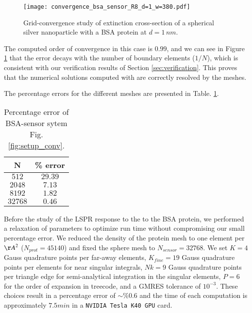 \begin{figure}[h] %
   \centering
   \texttt{[image: convergence\_bsa\_sensor\_R8\_d=1\_w=380.pdf]} 
   \caption{Grid-convergence study of extinction cross-section of a spherical silver
            nanoparticle with a BSA protein at $d=1 \, nm$.}
   \label{fig:error_sphere-bsa}
\end{figure}

The computed order of convergence in this case is $0.99$, and we can see in 
Figure \ref{fig:error_sphere-bsa} that the error decays with the number
of boundary elements ($1/N$), which is consistent with our verification 
results of Section \ref{sec:verification}. This proves that the
numerical solutions computed with \pygbe are correctly resolved by the meshes.

The percentage errors for the different meshes are presented in Table. \ref{table:err_bsa_sensor}.

\begin{table}[h]
    \centering
    \caption{\label{table:err_bsa_sensor} Percentage error of BSA-sensor sytem Fig.\ref{fig:setup_conv}.} 
    \begin{tabular}{c c}
    \hline%
    N & \% error \\
    \hline%
     $512$ & $29.39$ \\
     $2048$ & $7.13$ \\
     $8192$ & $1.82$ \\
     $32768$ & $0.46$ \\
    \hline%
    \end{tabular}
\end{table}

Before the study of the LSPR response to the to the BSA protein, we performed a 
relaxation of parameters to optimize run time without compromising our small
percentage error. We reduced the density of the protein mesh to one element per
${\AA}^2$ ($N_{prot}=45140$) and fixed the sphere mesh to $N_{sensor}=32768$. We
set $K=4$ Gauss quadrature points per far-away elements, $K_{fine} = 19$ Gauss
quadrature points per elements for near singular integrals, $Nk = 9$ Gauss 
quadrature points per triangle edge for semi-analytical integration in the 
singular elements, $P=6$ for the order of expansion in treecode, and a GMRES 
tolerance of $10^{-3}$. These choices result in a percentage error of $\sim\%0.6$
and the time of each computation is approximately $7.5 min$ in a \texttt{NVIDIA Tesla K40 GPU}
card. 

